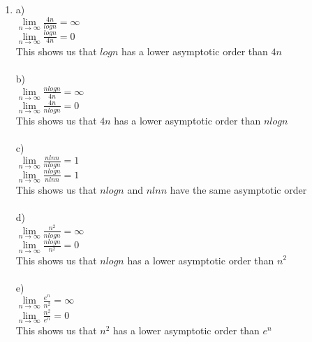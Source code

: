 \documentclass[11pt]{article}
\begin{document}
\begin{enumerate}
                \item
                \tab a)\\
                    \tab \tab $\lim \limits_{n \to \infty} \frac{4n}{logn} = \infty$\\
                    \tab \tab $\lim \limits_{n \to \infty} \frac{logn}{4n}= 0$\\
                    \tab \tab This shows us that $logn$ has a lower asymptotic order than $4n$\\ \\
                    \tab b)\\
                    \tab \tab $\lim \limits_{n \to \infty} \frac{nlogn}{4n} = \infty$\\
                    \tab \tab $\lim \limits_{n \to \infty} \frac{4n}{nlogn}= 0$\\
                    \tab \tab This shows us that $4n$ has a lower asymptotic order than $nlogn$\\ \\
                    \tab c)\\
                    \tab \tab $\lim \limits_{n \to \infty} \frac{nlnn}{nlogn} = 1$\\
                    \tab \tab $\lim \limits_{n \to \infty} \frac{nlogn}{nlnn} = 1$\\
                    \tab \tab This shows us that $nlogn$ and $nlnn$ have the same asymptotic order\\ \\
                    \tab d)\\
                    \tab \tab $\lim \limits_{n \to \infty} \frac{n^2}{nlogn} = \infty$\\
                    \tab \tab $\lim \limits_{n \to \infty} \frac{nlogn}{n^2} = 0$\\
                    \tab \tab This shows us that $nlogn$ has a lower asymptotic order than $n^2$\\ \\
                    \tab e)\\
                    \tab \tab $\lim \limits_{n \to \infty} \frac{e^n}{n^2} = \infty$\\
                    \tab \tab $\lim \limits_{n \to \infty} \frac{n^2}{e^n} = 0$\\
                    \tab \tab This shows us that $n^2$ has a lower asymptotic order than $e^n$\\ \\


\end{enumerate}
\end{document}
